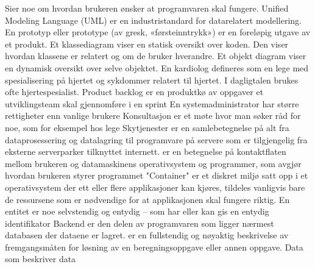  Sier noe om hvordan brukeren ønsker at programvaren skal fungere.
 Unified Modeling Language (UML) er en industristandard for datarelatert modellering.
 En prototyp eller prototype (av gresk, «førsteinntrykk») er en foreløpig utgave av et produkt.
 Et klassediagram viser en statisk oversikt over koden. Den viser hvordan klassene er relatert og om de bruker hverandre. Et objekt diagram viser en dynamisk oversikt over selve objektet.
 En kardiolog defineres som en lege med spesialisering på hjertet og sykdommer relatert til hjertet. I dagligtalen brukes ofte hjertespesialist.
 Product backlog er en produktkø av oppgaver et utviklingsteam skal gjennomføre i en sprint
 En systemadministrator har større rettigheter enn vanlige brukere
 Konsultasjon er et møte hvor man søker råd for noe, som for eksempel hos lege
 Skytjenester er en samlebetegnelse på alt fra dataprosessering og datalagring til programvare på servere som er tilgjengelig fra eksterne serverparker tilknyttet internett.
 er en betegnelse på kontaktflaten mellom brukeren og datamaskinens operativsystem og programmer, som avgjør hvordan brukeren styrer programmet
 "Container" er et diskret miljø satt opp i et operativsystem der ett eller flere applikasjoner kan kjøres, tildeles vanligvis bare de ressursene som er nødvendige for at applikasjonen skal fungere riktig.
 En entitet er noe selvstendig og entydig – som har eller kan gis en entydig identifikator
 Backend er den delen av programvaren som ligger nærmest databasen der dataene er lagret.
 er en fullstendig og nøyaktig beskrivelse av fremgangsmåten for løsning av en beregningsoppgave eller annen oppgave.
 Data som beskriver data




 





